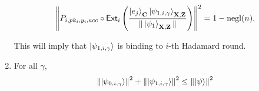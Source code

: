 \begin{lemma}
\begin{enumerate}
\begin{align}
     \left\lVert P_{i,pk_i,y_i,acc} \circ \mathsf{Ext}_i\left(\frac{\ket{e_j}_{\mathbf{C}}\ket{\psi_{1,i,\gamma}}_{\mathbf{X},\mathbf{Z}}}{\|\ket{\psi_1}_{\mathbf{X},\mathbf{Z}}\|}\right)\right\rVert^2 =1-\operatorname{negl}(n).
\end{align}

This will imply that    $\ket{\psi_{1,i,\gamma}}$ is binding to $i$-th Hadamard round.

\item \label{property-partition-norm-sum}
  For all $\gamma$, 
  \begin{align}
    \left\lVert\ket{\psi_{0,i,\gamma}}\right\rVert^2+ \left\lVert\ket{\psi_{1,i,\gamma}}\right\rVert^2 \leq  \left\lVert\ket{\psi}\right\rVert^2 
\end{align}

  

 


\end{enumerate}
\end{lemma}








